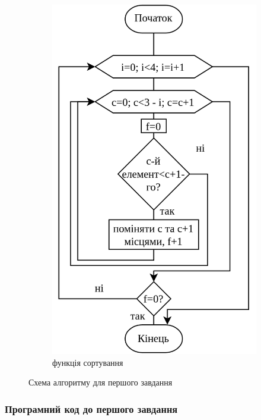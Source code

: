 \documentclass[12pt]{extreport}
\begin{document}
\begin{figure}[h]
\begin{subfigure}[b]{.3\textwidth}
		\includegraphics[width=\textwidth]{fch/sort.png}
		\caption{функція сортування}
	\end{subfigure}
	\caption{Схема алгоритму для першого завдання}
	\label{task2}
\end{figure}

\newpage
\subsubsection*{Програмний код до першого завдання}
\end{document}
